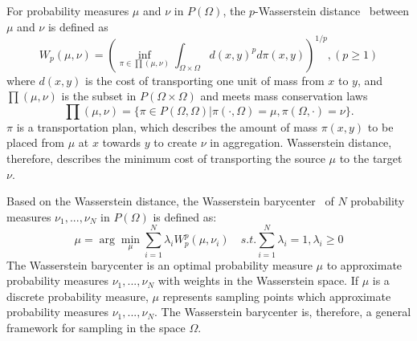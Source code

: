 
For probability measures $\mu$ and $\nu$ in $P(\Omega)$,
the $p$-Wasserstein distance~\cite{villani:2008:optimal} between $\mu$ and $\nu$ is defined as
\begin{equation*}
  W_p(\mu,\nu)=\left(\inf\limits_{\pi\in\prod(\mu,\nu)}\int_{\Omega\times\Omega}d(x,y)^pd\pi(x,y)\right )^{1/p}, (p\geq1)
\end{equation*}
where $d(x,y)$ is the cost of transporting one unit of mass from $x$ to $y$,
and  $\prod(\mu,\nu)$ is the subset in $P(\Omega\times\Omega)$ and meets mass conservation laws
\begin{equation*}
\prod(\mu,\nu)=\{\pi\in P(\Omega,\Omega)|\pi(\cdot,\Omega)=\mu,\pi(\Omega,\cdot)=\nu\}.
\end{equation*}
$\pi$ is a transportation plan,
which describes the amount of mass $\pi(x,y)$ to be placed from $\mu$ at $x$ towards $y$ to create $\nu$ in aggregation.
Wasserstein distance, therefore, describes the minimum cost of transporting the source $\mu$ to the target $\nu$.


Based on the Wasserstein distance,
the Wasserstein barycenter~\cite{agueh:2011:barycenters,cuturi:2013:fast,BTSSPP:2016:Wasserstein} of $N$ probability measures ${\nu_1,...,\nu_N}$ in $P(\Omega)$ is defined as:
\begin{equation}\label{WB}
    \mu=\arg\min\limits_\mu\sum\limits_{i=1}^N\lambda_iW_p^p(\mu,\nu_i)  \quad
    s.t. \sum\limits_{i=1}^N\lambda_i=1, \lambda_i\geq0
\end{equation}
The Wasserstein barycenter is an optimal probability measure $\mu$ to approximate probability measures ${\nu_1,...,\nu_N}$ with weights in the Wasserstein space.
If $\mu$ is a discrete probability measure,
$\mu$ represents sampling points which approximate probability measures ${\nu_1,...,\nu_N}$.
The Wasserstein barycenter is, therefore, a general framework for sampling in the space $\Omega$.
